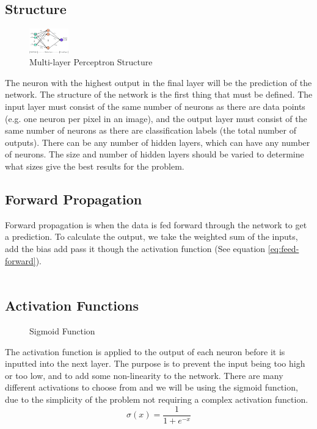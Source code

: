 \documentclass[a1,portrait]{a1poster}
\begin{document}
\begin{multicols}{2}
\subsection*{Structure}
\begin{figure}
    \centering
    \includegraphics[width=0.15\textwidth]{assets/multilayer perceptron.png}
    \caption{Multi-layer Perceptron Structure}
    \label{fig:structure}
\end{figure}
The neuron with the highest output in the final layer will be the prediction of the network.
The structure of the network is the first thing that must be defined. The input layer must consist of the same number of neurons as there are data points (e.g. one neuron per pixel in an image), and the output layer must consist of the same number of neurons as there are classification labels (the total number of outputs). There can be any number of hidden layers, which can have any number of neurons. The size and number of hidden layers should be varied to determine what sizes give the best results for the problem. 

\subsection*{Forward Propagation}
Forward propagation is when the data is fed forward through the network to get a prediction. To calculate the output, we take the weighted sum of the inputs, add the bias add pass it though the activation function (See equation \ref{eq:feed-forward}).
\\\\
\subsection*{Activation Functions}
\begin{figure}
    \centering
    \caption{Sigmoid Function}
    \label{fig:sigmoid}
\end{figure}
The activation function is applied to the output of each neuron before it is inputted into the next layer. The purpose is to prevent the input being too high or too low, and to add some non-linearity to the network. There are many different activations to choose from and we will be using the sigmoid function, due to the simplicity of the problem not requiring a complex activation function.
\begin{equation}
    \sigma(x)=\frac{1}{1+e^{-x}}
    \label{eq:sigmoid}
\end{equation}


\end{multicols}
\end{document}
